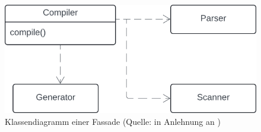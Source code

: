 \begin{figure}
    \centering
    \includegraphics[scale=0.4]{chapters/Anhang/CheatSheets/SE2/img/fassade}
    \caption{Klassendiagramm einer Fassade (Quelle: in Anlehnung an \cite[186]{GHJV94})}
    \label{fig:fassade_cc}
\end{figure}

